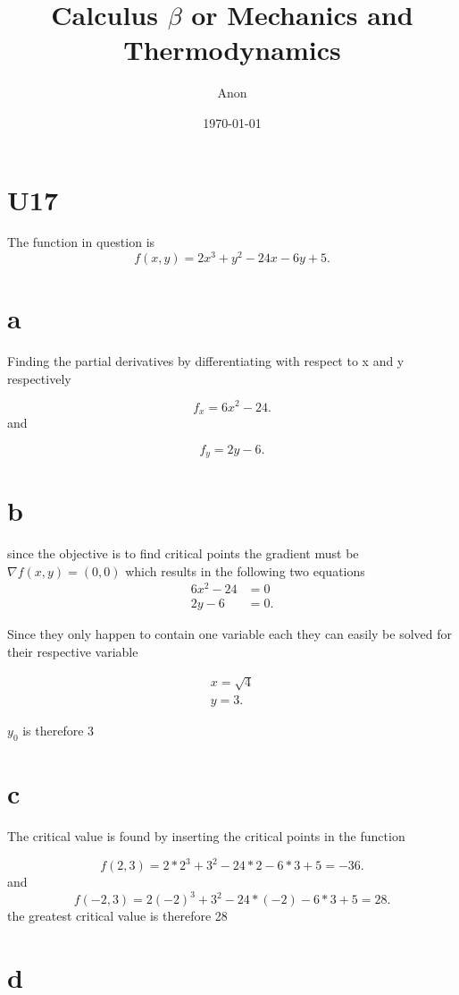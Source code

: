 \documentclass[12pt,a4paper]{article}
\title{Calculus $\beta$ or Mechanics and Thermodynamics}
\author{Anon}
\date{\today}
\begin{document}
\maketitle
	



\section{U17} 

The function in question is \[
	f(x,y)=2x^3+y^2-24x-6y+5
.\] 


\section{a} 

Finding the partial derivatives by differentiating with respect to x and y respectively

\[
f_{x} = 6x^2-24
.\] 
and

\[
f_{y} = 2y-6
.\] 


\section{b}

since the objective is to find critical points the gradient must be $\nabla f(x,y) = (0, 0)$ which results in the following two equations
\begin{align*}
	6x^2-24&=0\\ 2y-6&=0
.\end{align*}

Since they only happen to contain one variable each they can easily be solved for their respective variable

\begin{align*}
	x=\sqrt{4}\\
	y=3
.\end{align*}

$y_0$ is therefore 3


\section{c}

The critical value is found by inserting the critical points in the function

\[
	f(2,3)=2*2^3+3^2-24*2-6*3+5= -36
.\] 
and
\[
	f(-2,3)=2(-2)^3+3^2-24*(-2)-6*3+5=28
.\] 
the greatest critical value is therefore 28


\section{d} 
\end{document}
